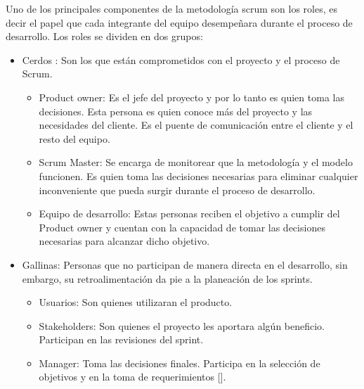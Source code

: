 Uno de los principales componentes de la metodología scrum son los roles, es decir el papel que cada integrante del equipo desempeñara durante el proceso de desarrollo. Los roles se dividen en dos grupos:
\begin{itemize}
	\item Cerdos : Son los que están comprometidos con el proyecto y el proceso de Scrum.
		\begin{itemize}
			\item Product owner: Es el jefe del proyecto y por lo tanto es quien toma las decisiones. Esta persona es quien conoce más del proyecto y las necesidades del cliente. Es el puente de comunicación entre el cliente y el resto del equipo. 
			\item Scrum Master: Se encarga de monitorear que la metodología y el modelo funcionen. Es quien toma las decisiones necesarias para eliminar cualquier inconveniente que pueda surgir durante el proceso de desarrollo. 
			\item Equipo de desarrollo: Estas personas reciben el objetivo a cumplir del Product owner y cuentan con la capacidad de tomar las decisiones necesarias para alcanzar dicho objetivo.
		\end{itemize}
	\item Gallinas: Personas que no participan de manera directa en el desarrollo, sin embargo, su retroalimentación da pie a la planeación de los sprints.
		\begin{itemize}
			\item Usuarios: Son quienes utilizaran el producto.
			\item Stakeholders: Son quienes el proyecto les aportara algún beneficio. Participan en las revisiones del sprint.
			\item Manager: Toma las decisiones finales. Participa en la selección de objetivos y en la toma de requerimientos [].
		\end{itemize}
\end{itemize}

